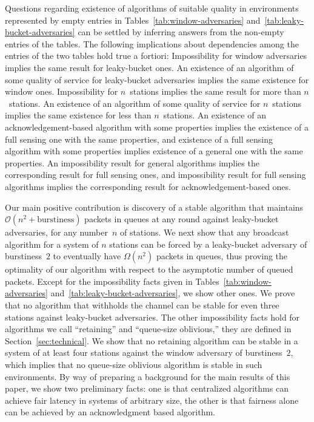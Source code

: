 \documentclass[11pt]{article}
\newcommand{\cO}{\mathcal{O}}
\begin{document}
Questions regarding existence of algorithms of suitable quality in environments represented by  empty entries in Tables~\ref{tab:window-adversaries} and~\ref{tab:leaky-bucket-adversaries} can be settled by inferring answers from the non-empty  entries of the tables.
The following implications about dependencies among the entries of the two tables hold true a fortiori:
Impossibility for window  adversaries implies the same result for leaky-bucket ones.
An existence of an algorithm of some quality of service for leaky-bucket adversaries implies the  same existence for window ones.
Impossibility for $n$~stations implies the same result for more than $n$~stations.
An existence of an algorithm of some quality of service for $n$~stations implies the same existence for less than $n$~stations.
An existence of an acknowledgement-based algorithm with some properties implies the existence of a full sensing one with the same properties, and existence of a full sensing  algorithm with some properties implies existence of a general one with the same properties.
An impossibility result for general algorithms implies the corresponding result for full sensing ones, and impossibility result for full sensing algorithms implies the corresponding result for acknowledgement-based ones.

Our main positive contribution is discovery of a stable algorithm that maintains $\cO(n^2+\text{burstiness})$ packets in queues at any round against leaky-bucket adversaries, for any number~$n$ of stations.
We next show that any broadcast algorithm for a system of $n$ stations can be forced by a leaky-bucket adversary of burstiness~$2$ to eventually  have $\Omega(n^2)$ packets in queues, thus proving the optimality of our algorithm with respect to the asymptotic number of queued packets.
Except for the impossibility facts given in Tables~\ref{tab:window-adversaries} and~\ref{tab:leaky-bucket-adversaries}, we show other ones.
We prove that no algorithm that withholds the channel can be stable for even three stations against leaky-bucket adversaries.
The other impossibility facts hold for algorithms we call ``retaining'' and ``queue-size oblivious,'' they are defined in Section~\ref{sec:technical}.
We show that no retaining algorithm can be stable in a system of at least four stations against the window adversary of burstiness~$2$, which implies that no queue-size oblivious algorithm is stable in such environments.
By way of preparing a background for the main results of this paper, we show two preliminary facts: one is that centralized algorithms can achieve fair latency in systems of arbitrary size, the other is that fairness alone can be achieved by an acknowledgment based algorithm.
\end{document}
